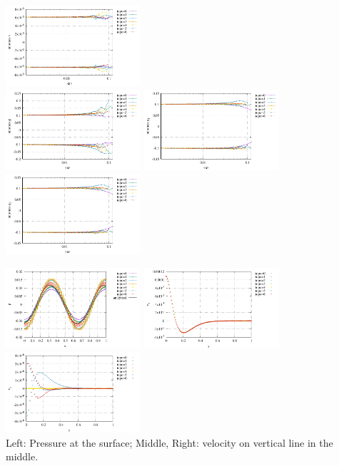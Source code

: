 \begin{center}
\includegraphics[width=5cm]{python_codes/fieldstone_78/results/stats_v_exp5.pdf}\\
\includegraphics[width=5cm]{python_codes/fieldstone_78/results/stats_p_exp5.pdf}
\includegraphics[width=5cm]{python_codes/fieldstone_78/results/stats_q1_exp5.pdf}
\includegraphics[width=5cm]{python_codes/fieldstone_78/results/stats_q2_exp5.pdf}
\end{center}

\begin{center}
\includegraphics[width=5cm]{python_codes/fieldstone_78/results/pressure_top_exp5.pdf}
\includegraphics[width=5cm]{python_codes/fieldstone_78/results/vx_profile_exp5.pdf}
\includegraphics[width=5cm]{python_codes/fieldstone_78/results/vy_profile_exp5.pdf}\\
{\captionfont Left: Pressure at the surface; Middle, Right: velocity on vertical line in the middle.}
\end{center}

